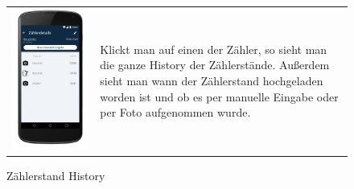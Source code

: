 \begin{figure}[h]
\begin{tabularx}{\textwidth}{X  X}
	\includegraphics[scale = 0.155]{img/AndroidMockup/history} \caption{Zählerstand History} & Klickt man auf einen der Zähler, so sieht man die ganze History der Zählerstände. Außerdem sieht man wann der Zählerstand hochgeladen worden ist und ob es per manuelle Eingabe oder per Foto aufgenommen wurde. \\
\end{tabularx}
\end{figure}

